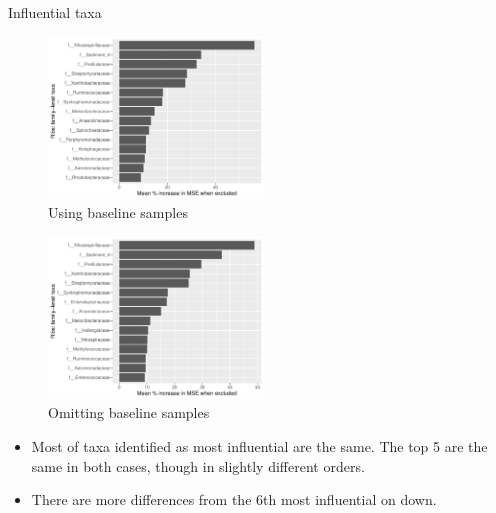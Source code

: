 \documentclass{beamer}
\begin{document}
\begin{frame}{Influential taxa}

  \begin{minipage}{0.47\textwidth}
    \begin{figure}
      \includegraphics[width=2.25in]{RiceRivers/bacteria/use_families/w_ribs/w_baseline/families_rib_w_baseline_PercIncMSE_barchart}
      \caption{Using baseline samples}
    \end{figure}
  \end{minipage}
  \begin{minipage}{0.47\textwidth}
    \begin{figure}
      \includegraphics[width=2.25in]{RiceRivers/bacteria/use_families/w_ribs/no_baseline/families_rib_no_baseline_PercIncMSE_barchart}
      \caption{Omitting baseline samples}
    \end{figure}
  \end{minipage}
  \vspace{0.1in}
  {\scriptsize
  \begin{itemize}
  \item Most of taxa identified as most influential are the same.  The top 5 are the same in both cases, though in slightly different orders.
  \item There are more differences from the 6th most influential on down.
  \end{itemize}
  }

\end{frame}
\end{document}
